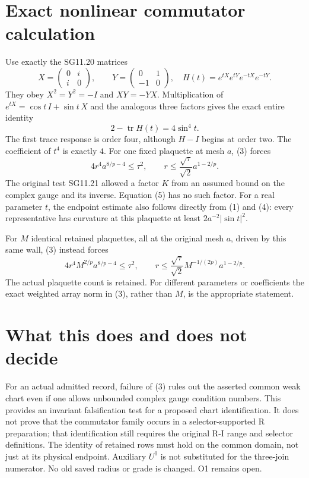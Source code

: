 \documentclass{article}
\begin{document}
\section{Exact nonlinear commutator calculation}
Use exactly the SG11.20 matrices
\[
 X=\begin{pmatrix}0&i\\i&0\end{pmatrix},\qquad
 Y=\begin{pmatrix}0&1\\-1&0\end{pmatrix},
 \quad H(t)=e^{tX}e^{tY}e^{-tX}e^{-tY}.
\]
They obey $X^2=Y^2=-I$ and $XY=-YX$. Multiplication of
$e^{tX}=\cos t\,I+\sin t\,X$ and the analogous three factors gives the exact entire identity
\[
 2-\operatorname{tr}H(t)=4\sin^4 t.
 \tag{4}
\]
The first trace response is order four, although $H-I$ begins at order two. The coefficient of $t^4$ is exactly $4$. For one fixed plaquette at mesh $a$, (3) forces
\[
 4r^4a^{8/p-4}\leq\tau^2,
 \qquad r\leq\frac{\sqrt\tau}{\sqrt2}a^{1-2/p}.
 \tag{5}
\]
The original test SG11.21 allowed a factor $K$ from an assumed bound on the complex gauge and its inverse. Equation (5) has no such factor. For a real parameter $t$, the endpoint estimate also follows directly from (1) and (4): every representative has curvature at this plaquette at least $2a^{-2}|\sin t|^2$.

For $M$ identical retained plaquettes, all at the original mesh $a$, driven by this same wall, (3) instead forces
\[
 4r^4 M^{2/p}a^{8/p-4}\leq\tau^2,
 \qquad r\leq\frac{\sqrt\tau}{\sqrt2}M^{-1/(2p)}a^{1-2/p}.
 \tag{6}
\]
The actual plaquette count is retained. For different parameters or coefficients the exact weighted array norm in (3), rather than $M$, is the appropriate statement.

\section{What this does and does not decide}
For an actual admitted record, failure of (3) rules out the asserted common weak chart even if one allows unbounded complex gauge condition numbers. This provides an invariant falsification test for a proposed chart identification. It does not prove that the commutator family occurs in a selector-supported R preparation; that identification still requires the original R-I range and selector definitions. The identity of retained rows must hold on the common domain, not just at its physical endpoint. Auxiliary $U^0$ is not substituted for the three-join numerator. No old saved radius or grade is changed. O1 remains open.
\end{document}
